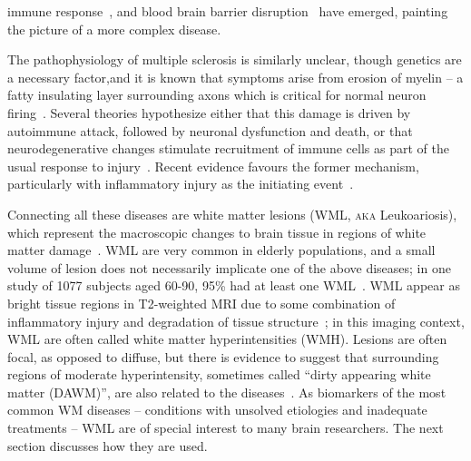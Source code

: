 immune response~\cite{Heppner2015},
and blood brain barrier disruption~\cite{Bell2009} have emerged,
painting the picture of a more complex disease.
\par
The pathophysiology of multiple sclerosis is similarly unclear,
though genetics are a necessary factor,and it is known that symptoms arise from erosion of myelin 
-- a fatty insulating layer surrounding axons
which is critical for normal neuron firing~\cite{Trapp2008}.
Several theories hypothesize either that this damage is driven by
autoimmune attack, followed by neuronal dysfunction and death,
or that neurodegenerative changes stimulate recruitment of immune cells
as part of the usual response to injury~\cite{Lucchinetti2000,Trapp2008}.
Recent evidence favours the former mechanism,
particularly with inflammatory injury as the initiating event~\cite{Ciccarelli2014,Mahad2015}.
\par
Connecting all these diseases are white matter lesions (WML, \textsc{aka} Leukoariosis),
which represent the macroscopic changes to brain tissue
in regions of white matter damage~\cite{Debette2010,Bakshi2005,Wardlaw2015}.
WML are very common in elderly populations,
and a small volume of lesion does not necessarily implicate one of the above diseases;
in one study of 1077 subjects aged 60-90, 95\% had at least one WML~\cite{DeLeeuw2001}.
WML appear as bright tissue regions in T2-weighted MRI due to some combination of
inflammatory injury and degradation of tissue structure~\cite{Bakshi2005,Wardlaw2015};
in this imaging context, WML are often called white matter hyperintensities (WMH).
Lesions are often focal, as opposed to diffuse, but there is evidence to suggest that
surrounding regions of moderate hyperintensity,
sometimes called ``dirty appearing white matter (DAWM)'',
are also related to the diseases~\cite{Ge2003}.
As biomarkers of the most common WM diseases
-- conditions with unsolved etiologies and inadequate treatments --
WML are of special interest to many brain researchers.
The next section discusses how they are used.

